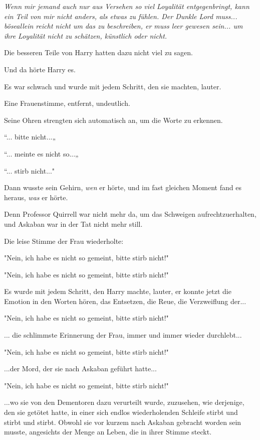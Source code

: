 {\emph{\emph{Wenn mir jemand auch nur aus Versehen so viel Loyalität entgegenbringt, kann ein Teil von mir nicht anders, als etwas zu fühlen. Der Dunkle Lord muss...} böse\emph{allein reicht nicht um das zu beschreiben, er muss leer gewesen sein... um ihre Loyalität nicht zu schätzen, künstlich oder nicht.}}

Die besseren Teile von Harry hatten dazu nicht viel zu sagen.

Und da hörte Harry es.

Es war schwach und wurde mit jedem Schritt, den sie machten, lauter.

Eine Frauenstimme, entfernt, undeutlich.

Seine Ohren strengten sich automatisch an, um die Worte zu erkennen.

“... bitte nicht...„

“... meinte es nicht so...„

“... stirb nicht..."

Dann wusste sein Gehirn, \emph{wen} er hörte, und im fast gleichen Moment fand es heraus, \emph{was} er hörte.

Denn Professor Quirrell war nicht mehr da, um das Schweigen aufrechtzuerhalten, und Askaban war in der Tat nicht mehr still.

Die leise Stimme der Frau wiederholte:

"Nein, ich habe es nicht so gemeint, bitte stirb nicht!"

"Nein, ich habe es nicht so gemeint, bitte stirb nicht!"

Es wurde mit jedem Schritt, den Harry machte, lauter, er konnte jetzt die Emotion in den Worten hören, das Entsetzen, die Reue, die Verzweiflung der...

"Nein, ich habe es nicht so gemeint, bitte stirb nicht!"

... die schlimmste Erinnerung der Frau, immer und immer wieder durchlebt...

"Nein, ich habe es nicht so gemeint, bitte stirb nicht!"

...der Mord, der sie nach Askaban geführt hatte...

"Nein, ich habe es nicht so gemeint, bitte stirb nicht!"

...wo sie von den Dementoren dazu verurteilt wurde, zuzusehen, wie derjenige, den sie getötet hatte, in einer sich endlos wiederholenden Schleife stirbt und stirbt und stirbt. Obwohl sie vor kurzem nach Askaban gebracht worden sein musste, angesichts der Menge an Leben, die in ihrer Stimme steckt.

}
